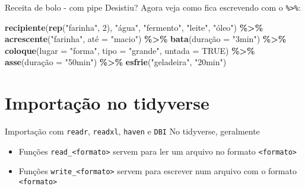 \documentclass[
  10pt,
  ignorenonframetext,
]{beamer}
\newenvironment{Shaded}{\begin{snugshade}}{\end{snugshade}}
\newcommand{\DataTypeTok}[1]{\textcolor[rgb]{0.13,0.29,0.53}{#1}}
\newcommand{\DecValTok}[1]{\textcolor[rgb]{0.00,0.00,0.81}{#1}}
\newcommand{\KeywordTok}[1]{\textcolor[rgb]{0.13,0.29,0.53}{\textbf{#1}}}
\newcommand{\NormalTok}[1]{#1}
\newcommand{\OperatorTok}[1]{\textcolor[rgb]{0.81,0.36,0.00}{\textbf{#1}}}
\newcommand{\OtherTok}[1]{\textcolor[rgb]{0.56,0.35,0.01}{#1}}
\newcommand{\StringTok}[1]{\textcolor[rgb]{0.31,0.60,0.02}{#1}}
\providecommand{\tightlist}{%
  \setlength{\itemsep}{0pt}\setlength{\parskip}{0pt}}
\begin{document}
\begin{frame}[fragile]{Receita de bolo - com pipe}
\protect\hypertarget{receita-de-bolo---com-pipe}{}
Desistiu? Agora veja como fica escrevendo com o
\texttt{\%\textgreater{}\%}:

\begin{Shaded}
\begin{Highlighting}[]
\KeywordTok{recipiente}\NormalTok{(}\KeywordTok{rep}\NormalTok{(}\StringTok{"farinha"}\NormalTok{, }\DecValTok{2}\NormalTok{), }\StringTok{"água"}\NormalTok{, }\StringTok{"fermento"}\NormalTok{, }\StringTok{"leite"}\NormalTok{, }\StringTok{"óleo"}\NormalTok{) }\OperatorTok{\%\textgreater{}\%}
\StringTok{  }\KeywordTok{acrescente}\NormalTok{(}\StringTok{"farinha"}\NormalTok{, até =}\StringTok{ "macio"}\NormalTok{) }\OperatorTok{\%\textgreater{}\%}
\StringTok{  }\KeywordTok{bata}\NormalTok{(duração =}\StringTok{ "3min"}\NormalTok{) }\OperatorTok{\%\textgreater{}\%}
\StringTok{  }\KeywordTok{coloque}\NormalTok{(}\DataTypeTok{lugar =} \StringTok{"forma"}\NormalTok{, }\DataTypeTok{tipo =} \StringTok{"grande"}\NormalTok{, }\DataTypeTok{untada =} \OtherTok{TRUE}\NormalTok{) }\OperatorTok{\%\textgreater{}\%}
\StringTok{  }\KeywordTok{asse}\NormalTok{(duração =}\StringTok{ "50min"}\NormalTok{) }\OperatorTok{\%\textgreater{}\%}
\StringTok{  }\KeywordTok{esfrie}\NormalTok{(}\StringTok{"geladeira"}\NormalTok{, }\StringTok{"20min"}\NormalTok{)}
\end{Highlighting}
\end{Shaded}
\end{frame}

\hypertarget{importauxe7uxe3o-no-tidyverse}{%
\section{Importação no tidyverse}\label{importauxe7uxe3o-no-tidyverse}}

\begin{frame}[fragile]{Importação com \texttt{readr}, \texttt{readxl},
\texttt{haven} e \texttt{DBI}}
\protect\hypertarget{importauxe7uxe3o-com-readr-readxl-haven-e-dbi}{}
No tidyverse, geralmente

\begin{itemize}
\tightlist
\item
  Funções \texttt{read\_\textless{}formato\textgreater{}} servem para
  ler um arquivo no formato \texttt{\textless{}formato\textgreater{}}
\item
  Funções \texttt{write\_\textless{}formato\textgreater{}} servem para
  escrever num arquivo com o formato
  \texttt{\textless{}formato\textgreater{}}
\end{itemize}
\end{frame}
\end{document}
